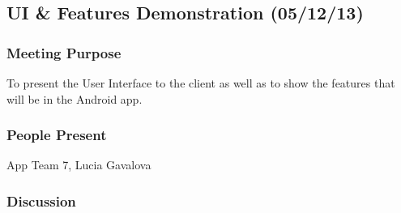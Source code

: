 \documentclass[12pt,a4paper,oneside,titlepage]{article}
\begin{document}
\subsection{UI \& Features Demonstration (05/12/13)}

\subsubsection{Meeting Purpose}
To present the User Interface to the client as well as to show the features that will be in the Android app.

\subsubsection{People Present} 
App Team 7, Lucia Gavalova

\subsubsection{Discussion}
\end{document}
